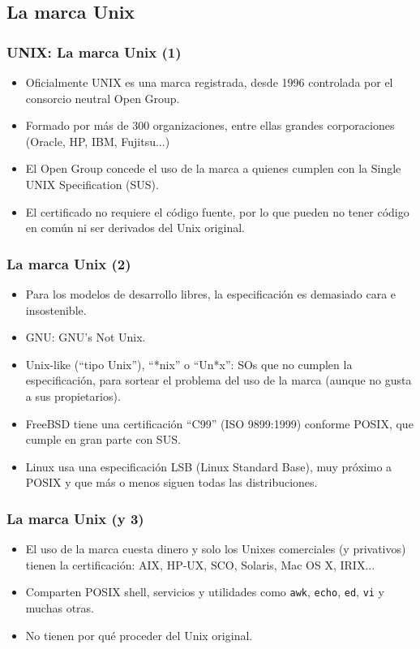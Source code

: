 \documentclass{beamer}
\begin{document}
\subsection{La marca Unix}
\begin{frame}
\frametitle{\textsc{UNIX\texttrademark}: La marca Unix (1)}

\begin{itemize}
\item Oficialmente \textsc{UNIX\texttrademark} es una \alert{marca registrada}, desde 1996 controlada por el consorcio neutral Open Group. 
\item Formado por más de 300 organizaciones, entre ellas grandes corporaciones (Oracle, HP, IBM, Fujitsu...)
\item El Open Group concede el uso de la marca a quienes cumplen con la Single UNIX Specification (SUS).
\item El certificado no requiere el código fuente, por lo que pueden no tener código en común ni ser derivados del Unix original.
\end{itemize}

\end{frame}

\begin{frame}
\frametitle{La marca Unix (2)}

\begin{itemize}
\item Para los modelos de desarrollo libres, la especificación es demasiado cara e insostenible.
\item GNU: \alert{G}NU's \alert{N}ot \alert{U}nix. 
\item \alert{Unix-like} (``tipo Unix''), ``*nix'' o ``Un*x'': SOs que no cumplen la especificación, para sortear el problema del uso de la marca (aunque no gusta a sus propietarios).
\item FreeBSD tiene una certificación ``C99'' (ISO 9899:1999) conforme POSIX, que cumple en gran parte con SUS.
\item Linux usa una especificación LSB (Linux Standard Base), muy próximo a POSIX y que más o menos siguen todas las distribuciones. 
\end{itemize}

\end{frame}



\begin{frame}
\frametitle{La marca Unix (y 3)}

\begin{itemize}
\item El uso de la marca cuesta dinero y solo los Unixes comerciales (y privativos) tienen la certificación: AIX, HP-UX, SCO, Solaris, Mac OS X, IRIX...
\item Comparten POSIX shell, servicios y utilidades como \texttt{awk}, \texttt{echo}, \texttt{ed}, \texttt{vi} y muchas otras.
\item No tienen por qué proceder del Unix original.
\end{itemize}

\end{frame}
\end{document}
